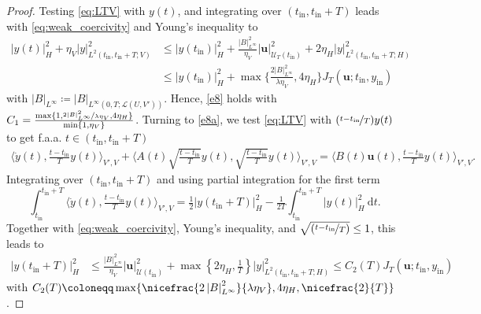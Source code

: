 \documentclass{m2an}
\newcommand{\bu}{\mathbf{u}}
\newcommand{\dt}{\mathrm{d}t}
\newcommand{\tint}{t_{\mathrm{in}}}
\newcommand{\yint}{y_{\mathrm{in}}}
\newcommand{\mU}{{\mathscr U}}
\newcommand{\norm}[2]{\left|#1\right|_{#2}}
\begin{document}
%
\begin{proof}
    Testing \eqref{eq:LTV} with $y(t)$, and  integrating over $(\tint,\tint+T)$ leads with \eqref{eq:weak_coercivity} and Young's inequality to
    \begin{align*}\nonumber
        \norm{y(t)}{H}^2+\eta_V\norm{y}{L^2(\tint,\tint + T;V)}^2 &\leq \norm{y(\tint)}{H}^2+\tfrac{\norm{B}{L^\infty}^2}{\eta_V}\norm{\bu}{\mU_T(\tint)}^2+2\eta_H\norm{y}{L^2(\tint,\tint + T;H)}^2\\
        & \leq\norm{y(\tint)}{H}^2+\max\Big\{\tfrac{2\norm{B}{L^\infty}^2}{\lambda\eta_V}, 4\eta_H \Big\} J_T(\bu;\tint,\yint)
    \end{align*}
    with $|B|_{L^\infty}\coloneqq |B|_{L^\infty(0,T;\mathcal{L}(U,V'))}$. Hence, \eqref{e8} holds with $C_1=\tfrac{\max\{1,\nicefrac{2\norm{B}{L^\infty}^2}{\lambda\eta_V},4\eta_H\}}{ \min\{1,\eta_V\}}$. Turning to \eqref{e8a}, we test \eqref{eq:LTV} with $(\nicefrac{t-\tint}{T})y(t)$ to get f.a.a. $t\in (\tint,\tint+T)$
    \begin{align*}
        \big\langle\dot y(t),\tfrac{t-\tint}{T}y(t)\big\rangle_{V',V}+\Big\langle A(t)\sqrt{\tfrac{t-\tint}{T}}y(t),\sqrt{\tfrac{t-\tint}{T}}y(t)\Big\rangle_{V',V}= \big\langle B(t)\bu(t),{\tfrac{t-\tint}{T}}y(t)\big\rangle_{V',V}.
    \end{align*}
    Integrating over $(\tint,\tint+T)$ and using partial integration for the first term
    \begin{equation*}
        \int_{\tint}^{\tint+T}\big\langle\dot y(t),\tfrac{t-\tint}{T}y(t)\big\rangle_{V',V} = \tfrac{1}{2}\norm{y(\tint+T)}{H}^2-\tfrac{1}{2T} \int_{\tint}^{\tint+T}\norm{y(t)}{H}^2\ \dt.
    \end{equation*}
    Together with \eqref{eq:weak_coercivity}, Young's inequality, and $\sqrt{(\nicefrac{t-\tint}{T})}\leq 1 $, this leads to
    \begin{align*}
        \norm{y(\tint+T)}{H}^2&\leq \tfrac{\norm{B}{L^\infty}^2}{\eta_V}\norm{\bu}{\mU(\tint)}^2+\max\left\{2\eta_H, \tfrac{1}{T}\right\}\norm{y}{L^2(\tint,\tint+T;H)}^2\leq C_2(T) J_T(\bu;\tint,\yint)
    \end{align*}
    with $C_2(T)\coloneqq \max\{\nicefrac{2\norm{B}{L^\infty}^2}{\lambda\eta_V},4\eta_H, \nicefrac{2}{T}\}$.
\end{proof}
%
\end{document}
